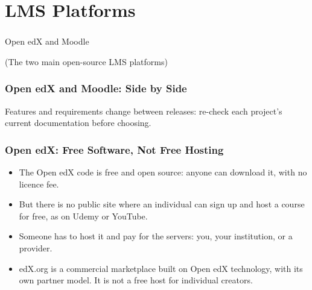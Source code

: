 \section[LMS]{LMS Platforms}

\begin{frame}[fragile]\frametitle{}
\begin{center}
{\Large Open edX and Moodle}

\medskip
{\small (The two main open-source LMS platforms)}
\end{center}
\end{frame}

\begin{frame}[fragile]\frametitle{Open edX and Moodle: Side by Side}
\begin{center}
\end{center}
{\footnotesize Features and requirements change between releases: re-check each project's current documentation before choosing.}
\end{frame}

\begin{frame}[fragile]\frametitle{Open edX: Free Software, Not Free Hosting}
\begin{itemize}
\item The Open edX code is free and open source: anyone can download it, with no licence fee.
\item But there is no public site where an individual can sign up and host a course for free, as on Udemy or YouTube.
\item Someone has to host it and pay for the servers: you, your institution, or a provider.
\item edX.org is a commercial marketplace built on Open edX technology, with its own partner model. It is not a free host for individual creators.
\end{itemize}
\end{frame}

